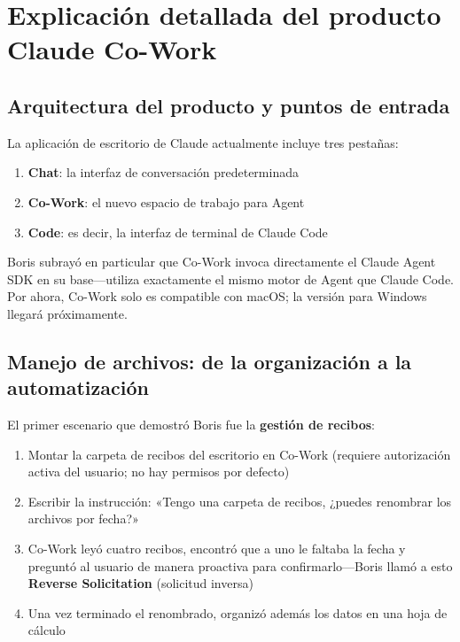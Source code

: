 \section{Explicación detallada del producto Claude Co-Work}

\subsection{Arquitectura del producto y puntos de entrada}

La aplicación de escritorio de Claude actualmente incluye tres pestañas:

\begin{enumerate}
    \item \textbf{Chat}: la interfaz de conversación predeterminada
    \item \textbf{Co-Work}: el nuevo espacio de trabajo para Agent
    \item \textbf{Code}: es decir, la interfaz de terminal de Claude Code
\end{enumerate}

Boris subrayó en particular que Co-Work invoca directamente el Claude Agent SDK en su base—utiliza exactamente el mismo motor de Agent que Claude Code. Por ahora, Co-Work solo es compatible con macOS; la versión para Windows llegará próximamente.

\subsection{Manejo de archivos: de la organización a la automatización}

El primer escenario que demostró Boris fue la \textbf{gestión de recibos}:

\begin{enumerate}
    \item Montar la carpeta de recibos del escritorio en Co-Work (requiere autorización activa del usuario; no hay permisos por defecto)
    \item Escribir la instrucción: «Tengo una carpeta de recibos, ¿puedes renombrar los archivos por fecha?»
    \item Co-Work leyó cuatro recibos, encontró que a uno le faltaba la fecha y preguntó al usuario de manera proactiva para confirmarlo—Boris llamó a esto \textbf{Reverse Solicitation} (solicitud inversa)
    \item Una vez terminado el renombrado, organizó además los datos en una hoja de cálculo
\end{enumerate}

